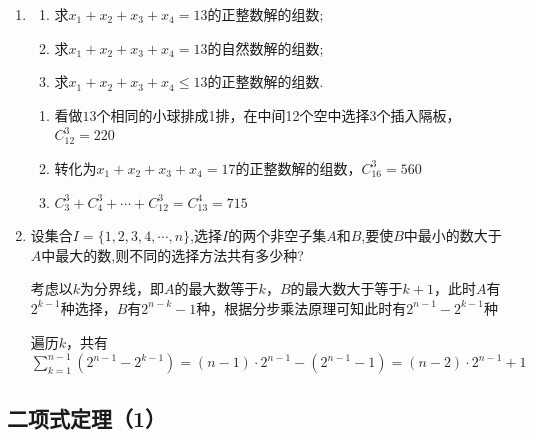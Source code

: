 \begin{enumerate}
\item 
\begin{enumerate}
    \item 求$x_{1}+x_{2}+x_{3}+x_{4}=13$的正整数解的组数;
    \item 求$x_{1}+x_{2}+x_{3}+x_{4}=13$的自然数解的组数;
    \item 求$x_{1}+x_{2}+x_{3}+x_{4}\le13$的正整数解的组数.
\end{enumerate}
\begin{jieda}
    \begin{enumerate}
        \item 看做$13$个相同的小球排成1排，在中间12个空中选择$3$个插入隔板，$C_{12}^3 = 220$
        \item 转化为$x_{1}+x_{2}+x_{3}+x_{4}=17$的正整数解的组数，$C_{16}^3 = 560$
        \item $C_3^3 + C_4^3 + \cdots + C_{12}^3 = C_{13}^4 = 715$
    \end{enumerate}
\end{jieda}

\item 设集合$I=\{1,2,3,4,\cdots,n\}$,选择$I$的两个非空子集$A$和$B$,要使$B$中最小的数大于$A$中最大的数,则不同的选择方法共有多少种?
\begin{jieda}
    考虑以$k$为分界线，即$A$的最大数等于$k$，$B$的最大数大于等于$k+1$，此时$A$有$2^{k-1}$种选择，$B$有$2^{n-k}-1$种，根据分步乘法原理可知此时有$2^{n-1} - 2^{k-1}$种

    遍历$k$，共有$\mathop{\sum }\limits_{{k = 1}}^{n-1}(2^{n-1} - 2^{k-1}) = (n-1) \cdot 2^{n-1} - (2^{n-1}-1) = (n-2) \cdot 2^{n-1} + 1$
\end{jieda}

\end{enumerate}
\clearpage



\subsection*{二项式定理（1）}

